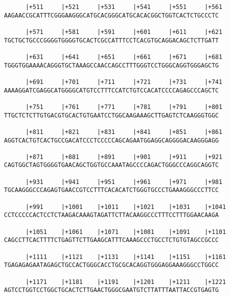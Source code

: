 \documentclass{article}
\begin{document}
\begin{Verbatim}
      |+511     |+521     |+531     |+541     |+551     |+561
AAGAACCGCATTTCGGGAAGGGCATGCACGGGCATGCACACGGCTGGTCACTCTGCCCTC
                                                            
      |+571     |+581     |+591     |+601     |+611     |+621
TGCTGCTGCCCGGGGTGGGGTGCACTCGCCATTTCCTCACGTGCAGGACAGCTCTTGATT
                                                            
      |+631     |+641     |+651     |+661     |+671     |+681
TGGGTGGAAAACAGGGTGCTAAAGCCAACCAGCCTTTGGGTCCTGGGCAGGTGGGAGCTG
                                                            
      |+691     |+701     |+711     |+721     |+731     |+741
AAAAGGATCGAGGCATGGGGCATGTCCTTTCCATCTGTCCACATCCCCAGAGCCCAGCTC
                                                            
      |+751     |+761     |+771     |+781     |+791     |+801
TTGCTCTCTTGTGACGTGCACTGTGAATCCTGGCAAGAAAGCTTGAGTCTCAAGGGTGGC
                                                            
      |+811     |+821     |+831     |+841     |+851     |+861
AGGTCACTGTCACTGCCGACATCCCTCCCCCAGCAGAATGGAGGCAGGGGACAAGGGAGG
                                                            
      |+871     |+881     |+891     |+901     |+911     |+921
CAGTGGCTAGTGGGGTGAACAGCTGGTGCCAAATAGCCCCAGACTGGGCCCAGGCAGGTC
                                                            
      |+931     |+941     |+951     |+961     |+971     |+981
TGCAAGGGCCCAGAGTGAACCGTCCTTTCACACATCTGGGTGCCCTGAAAGGGCCCTTCC
                                                            
      |+991     |+1001    |+1011    |+1021    |+1031    |+1041
CCTCCCCCACTCCTCTAAGACAAAGTAGATTCTTACAAGGCCCTTTCCTTTGGAACAAGA
                                                            
      |+1051    |+1061    |+1071    |+1081    |+1091    |+1101
CAGCCTTCACTTTTCTGAGTTCTTGAAGCATTTCAAAGCCCTGCCTCTGTGTAGCCGCCC
                                                            
      |+1111    |+1121    |+1131    |+1141    |+1151    |+1161
TGAGAGAGAATAGAGCTGCCACTGGGCACCTGCGCACAGGTGGGAGGAAAGGGCCTGGCC
                                                            
      |+1171    |+1181    |+1191    |+1201    |+1211    |+1221
AGTCCTGGTCCTGGCTGCACTCTTGAACTGGGCGAATGTCTTATTTAATTACCGTGAGTG
                                                            

\end{Verbatim}
\end{document}
